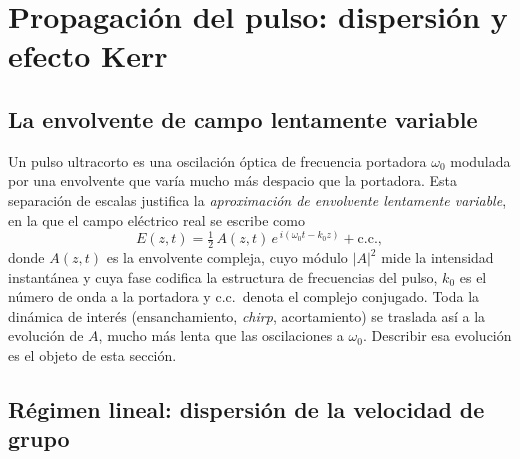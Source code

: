 
\chapter{Propagación del pulso: dispersión y efecto Kerr}
\label{app:propagacion}

\section{La envolvente de campo lentamente variable}

Un pulso ultracorto es una oscilación óptica de frecuencia portadora $\omega_0$
modulada por una envolvente que varía mucho más despacio que la portadora. Esta
separación de escalas justifica la \emph{aproximación de envolvente lentamente
variable}, en la que el campo eléctrico real se escribe como
%
\begin{equation}
    E(z,t) = \tfrac{1}{2}\,A(z,t)\,
    e^{\,i(\omega_0 t - k_0 z)} + \text{c.c.},
    \label{eq:envolvente}
\end{equation}
%
donde $A(z,t)$ es la envolvente compleja, cuyo módulo $|A|^2$ mide la intensidad
instantánea y cuya fase codifica la estructura de frecuencias del pulso, $k_0$
es el número de onda a la portadora y c.c.\ denota el complejo conjugado. Toda la
dinámica de interés (ensanchamiento, \emph{chirp}, acortamiento) se traslada así a
la evolución de $A$, mucho más lenta que las oscilaciones a $\omega_0$. Describir
esa evolución es el objeto de esta sección.

\section{Régimen lineal: dispersión de la velocidad de grupo}

